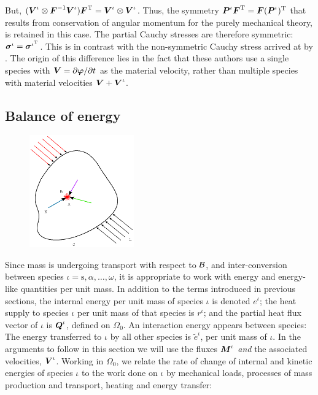\noindent But, $(\mbox{\boldmath$ V$}^\iota\otimes\mbox{\boldmath$ F$}^{-1}\mbox{\boldmath$ V$}^\iota)\mbox{\boldmath$ F$}^\mathrm{T}
= \mbox{\boldmath$ V$}^\iota\otimes\mbox{\boldmath$ V$}^\iota$. Thus, the symmetry
$\mbox{\boldmath$ P$}^\iota\mbox{\boldmath$ F$}^\mathrm{T} = \mbox{\boldmath$ F$}(\mbox{\boldmath$ P$}^\iota)^\mathrm{T}$ that results
from conservation of angular momentum for the purely mechanical
theory, is retained in this case. The partial Cauchy stresses are
therefore symmetric: $\mbox{\boldmath$\sigma$}^\iota = \mbox{\boldmath$\sigma$}^{\iota^\mathrm{T}}$.
This is in contrast with the non-symmetric Cauchy stress arrived
at by \citet{EpsteinMaugin:2000}. The origin of this difference
lies in the fact that these authors use a single species with $\mbox{\boldmath$ V$}
=
\partial\mbox{\boldmath$\varphi$}/\partial t$ as the material velocity, rather than
multiple species with material velocities $\mbox{\boldmath$ V$} + \mbox{\boldmath$ V$}^\iota$.

\subsection{Balance of energy}
\label{balance-of-energy}

\begin{figure}[ht]
  \centering
         {\includegraphics[width=0.4\textwidth]{images/elucidation/cp-energy}}
\end{figure}

Since mass is undergoing transport with respect to ${\mathcal B}$, and
inter-conversion between species $\iota =
\mathrm{s},\alpha,\dots,\omega$, it is appropriate to work with
energy and energy-like quantities per unit mass. In addition to
the terms introduced in previous sections, the internal energy per
unit mass of species $\iota$ is denoted $e^\iota$; the heat supply
to species $\iota$ per unit mass of that species is $r^\iota$; and
the partial heat flux vector of $\iota$ is $\mbox{\boldmath$ Q$}^\iota$, defined on
$\Omega_0$. An interaction energy appears between species: The
energy transferred to $\iota$ by all other species is
$\tilde{e}^\iota$, per unit mass of $\iota$. In the arguments to
follow in this section we will use the fluxes $\mbox{\boldmath$ M$}^\iota$
\emph{and} the associated velocities, $\mbox{\boldmath$ V$}^\iota$. Working in
$\Omega_0$, we relate the rate of change of internal and kinetic
energies of species $\iota$ to the work done on $\iota$ by
mechanical loads, processes of mass production and transport,
heating and energy transfer:


